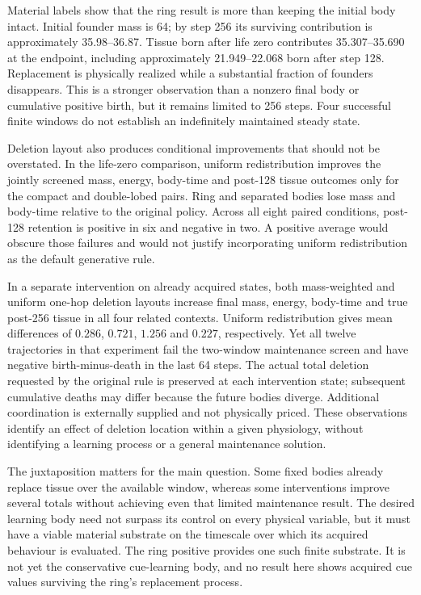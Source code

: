 Material labels show that the ring result is more than keeping the initial body intact. Initial founder mass is 64; by step 256 its surviving contribution is approximately 35.98--36.87. Tissue born after life zero contributes 35.307--35.690 at the endpoint, including approximately 21.949--22.068 born after step 128. Replacement is physically realized while a substantial fraction of founders disappears. This is a stronger observation than a nonzero final body or cumulative positive birth, but it remains limited to 256 steps. Four successful finite windows do not establish an indefinitely maintained steady state.


Deletion layout also produces conditional improvements that should not be overstated. In the life-zero comparison, uniform redistribution improves the jointly screened mass, energy, body-time and post-128 tissue outcomes only for the compact and double-lobed pairs. Ring and separated bodies lose mass and body-time relative to the original policy. Across all eight paired conditions, post-128 retention is positive in six and negative in two. A positive average would obscure those failures and would not justify incorporating uniform redistribution as the default generative rule.

In a separate intervention on already acquired states, both mass-weighted and uniform one-hop deletion layouts increase final mass, energy, body-time and true post-256 tissue in all four related contexts. Uniform redistribution gives mean differences of $0.286$, $0.721$, $1.256$ and $0.227$, respectively. Yet all twelve trajectories in that experiment fail the two-window maintenance screen and have negative birth-minus-death in the last 64 steps. The actual total deletion requested by the original rule is preserved at each intervention state; subsequent cumulative deaths may differ because the future bodies diverge. Additional coordination is externally supplied and not physically priced. These observations identify an effect of deletion location within a given physiology, without identifying a learning process or a general maintenance solution.

The juxtaposition matters for the main question. Some fixed bodies already replace tissue over the available window, whereas some interventions improve several totals without achieving even that limited maintenance result. The desired learning body need not surpass its control on every physical variable, but it must have a viable material substrate on the timescale over which its acquired behaviour is evaluated. The ring positive provides one such finite substrate. It is not yet the conservative cue-learning body, and no result here shows acquired cue values surviving the ring's replacement process.


